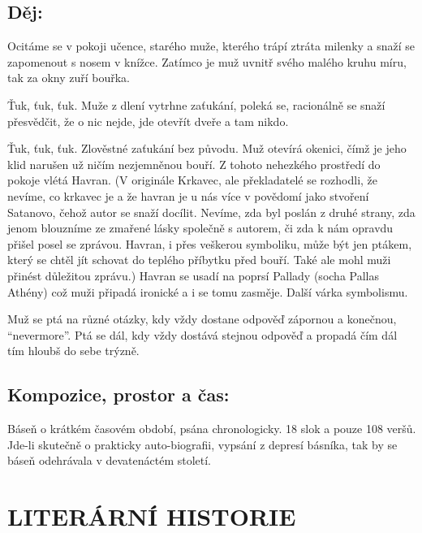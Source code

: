 \documentclass[A4paper]{extarticle} %
\begin{document}
\subsection*{Děj:}
{\setlength{\parindent}{0pt}\setlength{\parskip}{0.5em}
Ocitáme se v pokoji učence, starého muže, kterého trápí ztráta milenky a snaží se zapomenout s nosem v knížce. Zatímco je muž uvnitř svého malého kruhu míru, tak za okny zuří bouřka.

Ťuk, ťuk, ťuk. Muže z dlení vytrhne zaťukání, poleká se, racionálně se snaží přesvědčit, že o nic nejde, jde otevřít dveře a tam nikdo.

Ťuk, ťuk, ťuk. Zlověstné zaťukání bez původu. Muž otevírá okenici, čímž je jeho klid narušen už ničím nezjemněnou bouří. Z tohoto nehezkého prostředí do pokoje vlétá Havran. (V originále Krkavec, ale překladatelé se rozhodli, že nevíme, co krkavec je a že havran je u nás více v povědomí jako stvoření Satanovo, čehož autor se snaží docílit. Nevíme, zda byl poslán z druhé strany, zda jenom blouzníme ze zmařené lásky společně s autorem, či zda k nám opravdu přišel posel se zprávou. Havran, i přes veškerou symboliku, může být jen ptákem, který se chtěl jít schovat do teplého příbytku před bouří. Také ale mohl muži přinést důležitou zprávu.) Havran se usadí na poprsí Pallady (socha Pallas Athény) což muži připadá ironické a i se tomu zasměje. Další várka symbolismu.

Muž se ptá na různé otázky, kdy vždy dostane odpověď zápornou a konečnou, \enquote{nevermore}. Ptá se dál, kdy vždy dostává stejnou odpověď a propadá čím dál tím hloubš do sebe trýzně.
}

\subsection*{Kompozice, prostor a čas:}
\noindent 
Báseň o krátkém časovém období, psána chronologicky. 18 slok a pouze 108 veršů. Jde-li skutečně o prakticky auto-biografii, vypsání z depresí básníka, tak by se báseň odehrávala v devatenáctém století.


\section*{LITERÁRNÍ HISTORIE}

\end{document}
